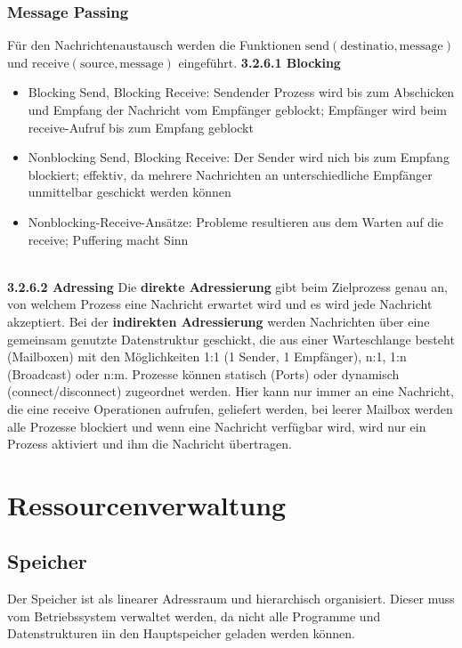 \documentclass{article}
\begin{document}
\subsubsection{Message Passing}
    Für den Nachrichtenaustausch werden die Funktionen $\text{send}(\text{destinatio},\text{message})$ und $\text{receive}(\text{source}, \text{message})$ eingeführt.\newline
    \textbf{3.2.6.1 Blocking}\newline
    \begin{itemize}
        \item Blocking Send, Blocking Receive: Sendender Prozess wird bis zum Abschicken und Empfang der Nachricht vom Empfänger geblockt; Empfänger wird beim receive-Aufruf bis zum Empfang geblockt
        \item Nonblocking Send, Blocking Receive: Der Sender wird nich bis zum Empfang blockiert; effektiv, da mehrere Nachrichten an unterschiedliche Empfänger unmittelbar geschickt werden können
        \item Nonblocking-Receive-Ansätze: Probleme resultieren aus dem Warten auf die receive; Puffering macht Sinn
    \end{itemize}\newline
    \\
    \textbf{3.2.6.2 Adressing}\newline
    Die \textbf{direkte Adressierung} gibt beim Zielprozess genau an, von welchem Prozess eine Nachricht erwartet wird und es wird jede Nachricht akzeptiert. Bei der \textbf{indirekten Adressierung} werden Nachrichten über eine gemeinsam genutzte Datenstruktur geschickt, die aus einer Warteschlange besteht (Mailboxen) mit den Möglichkeiten 1:1 (1 Sender, 1 Empfänger), n:1, 1:n (Broadcast) oder n:m. Prozesse können statisch (Ports) oder dynamisch (connect/disconnect) zugeordnet werden.\newline
    Hier kann nur immer an eine Nachricht, die eine receive Operationen aufrufen, geliefert werden, bei leerer Mailbox werden alle Prozesse blockiert und wenn eine Nachricht verfügbar wird, wird nur ein Prozess aktiviert und ihm die Nachricht übertragen.
    
\newpage
\section{Ressourcenverwaltung}
\subsection{Speicher}
    Der Speicher ist als linearer Adressraum und hierarchisch organisiert. Dieser muss vom Betriebssystem verwaltet werden, da nicht alle Programme und Datenstrukturen iin den Hauptspeicher geladen werden können.
\end{document}

